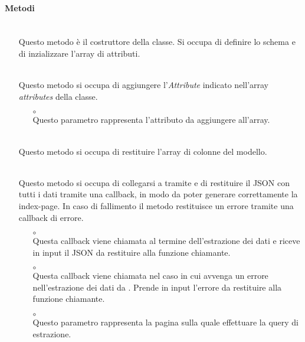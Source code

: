 \paragraph*{Metodi}
\begin{itemize}
\item[]  \\ Questo metodo è il costruttore della classe. Si occupa di definire lo schema e di inzializzare l'array di attributi.
\item[]  \\ Questo metodo si occupa di aggiungere l'\textit{Attribute} indicato nell'array \textit{attributes} della classe.
\begin{itemize}\addtolength{\itemsep}{-0.5\baselineskip}
\item[$\circ$]  \\ Questo parametro rappresenta l'attributo da aggiungere all'array.
\end{itemize}
\item[]  \\ Questo metodo si occupa di restituire l'array di colonne del modello.
\item[]  \\ Questo metodo si occupa di collegarsi a  tramite  e di restituire il JSON con tutti i dati tramite una callback, in modo da poter generare correttamente la index-page. In caso di fallimento il metodo restituisce un errore tramite una callback di errore.
\begin{itemize}\addtolength{\itemsep}{-0.5\baselineskip}
\item[$\circ$]  \\ Questa callback viene chiamata al termine dell'estrazione dei dati e riceve in input il JSON da restituire alla funzione chiamante.
\item[$\circ$]  \\ Questa callback viene chiamata nel caso in cui avvenga un errore nell'estrazione dei dati da . Prende in input l'errore da restituire alla funzione chiamante.
\item[$\circ$]  \\ Questo parametro rappresenta la pagina sulla quale effettuare la query di estrazione.

\end{itemize}
\end{itemize}
